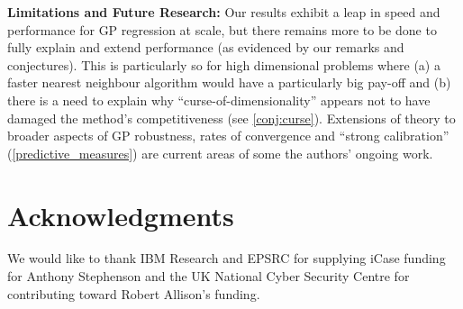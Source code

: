 \textbf{Limitations and Future Research:} Our results exhibit a leap in speed and performance for GP regression at scale, but there remains more to be done to fully explain and extend performance (as evidenced by our remarks and conjectures). This is particularly so for high dimensional problems where (a) a faster nearest neighbour algorithm would have a particularly big pay-off and (b) there is a need to explain why ``curse-of-dimensionality'' appears not to have damaged the method's competitiveness (see \autoref{conj:curse}). Extensions of theory to broader aspects of GP robustness, rates of convergence and ``strong calibration'' (\autoref{predictive_measures}) are current areas of some the authors' ongoing work.


\section*{Acknowledgments}
We would like to thank IBM Research and EPSRC for supplying iCase funding for Anthony Stephenson and the UK National Cyber Security Centre for contributing toward Robert Allison's funding.



\nocite{*}
